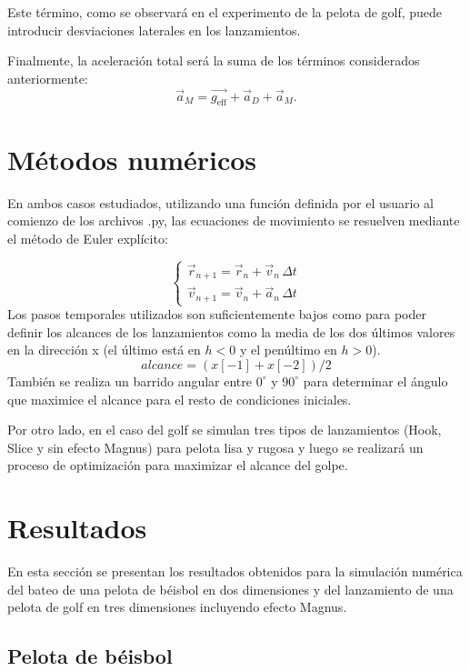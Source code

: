 \documentclass[11pt,a4paper]{article}
\begin{document}
Este término, como se observará en el experimento de la pelota de golf, puede introducir desviaciones laterales en los lanzamientos. 

Finalmente, la aceleración total será la suma de los términos considerados anteriormente:
\begin{equation}
\vec{a}_M = \vec{g_{\text{eff}}}+\vec{a}_D+\vec{a}_M.
\end{equation}

\section{Métodos numéricos}

En ambos casos estudiados, utilizando una función definida por el usuario al comienzo de los archivos .py, las ecuaciones de movimiento se resuelven mediante el método de Euler explícito:

\begin{equation}
\begin{cases}
\vec{r}_{n+1} = \vec{r}_n + \vec{v}_n \,\Delta t \\
\vec{v}_{n+1} = \vec{v}_n + \vec{a}_n \,\Delta t
\end{cases}
\end{equation}
Los pasos temporales utilizados son suficientemente bajos como para poder definir los alcances de los lanzamientos como la media de los dos últimos valores en la dirección x (el último está en $h<0$ y el penúltimo en $h>0$).
\begin{equation}
alcance = (x[-1] + x[-2]) / 2
\end{equation}
También se realiza un barrido angular entre $0^\circ$ y $90^\circ$ para determinar el ángulo que maximice el alcance para el resto de condiciones iniciales.

Por otro lado, en el caso del golf se simulan tres tipos de lanzamientos (Hook, Slice y sin efecto Magnus) para pelota lisa y rugosa y luego se realizará un proceso de optimización para maximizar el alcance del golpe.

\section{Resultados}

En esta sección se presentan los resultados obtenidos para la simulación numérica del bateo de una pelota de béisbol en dos dimensiones y del lanzamiento de una pelota de golf en tres dimensiones incluyendo efecto Magnus.

\subsection{Pelota de béisbol}
\end{document}

